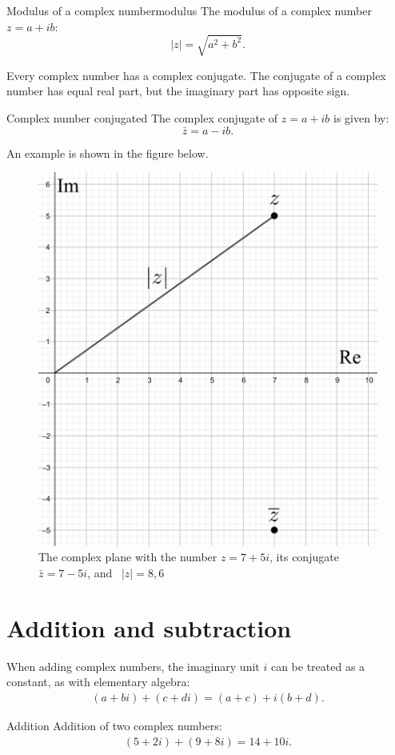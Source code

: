 \begin{definition}{Modulus of a complex number}{modulus}
The modulus of a complex number $z=a+ib$:
$$\mid z\mid=\sqrt{a^2+b^2}.$$
\end{definition}
\noindent
Every complex number has a complex conjugate. The conjugate of a complex number has equal real part, but the imaginary part has opposite sign.

\begin{definition}{Complex number conjugated}{}
The complex conjugate of $z=a+ib$ is given by:
$$\bar{z}=a-ib.$$
\end{definition}

\noindent An example is shown in the figure below.  

\begin{figure}[H]
\centering
\includegraphics[scale=0.2]{fig/img/complex_plan}
\caption{The complex plane with the number $z=7+5i$, its conjugate $\bar{z}=7-5i$, and \  $|z|=8,6$}
\end{figure}


\section{Addition and subtraction}
When adding complex numbers, the imaginary unit $i$ can be treated as a constant, as with elementary algebra:
\begin{align*}
(a + bi) + (c + di) = (a + c) + i(b + d).
\end{align*} 
\begin{example}{Addition}{}
Addition of two complex numbers:
\begin{align*}
(5+2i)+(9+8i)=14+10i.
\end{align*}
\end{example}


